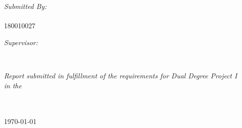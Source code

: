 \documentclass[
11pt, %
oneside, %
english, %
singlespacing, %
liststotoc, %
toctotoc, %
headsepline, %
]{MastersDoctoralThesis} %
\begin{document}
\begin{titlepage}
\begin{center}
\begin{minipage}[t]{0.4\textwidth}
\begin{flushleft} \large
\emph{Submitted By:}\\
{\authorname \\ 180010027} %
\end{flushleft}
\end{minipage}
\begin{minipage}[t]{0.4\textwidth}
\begin{flushright} \large
\emph{Supervisor:} \\
{\supname} %
\end{flushright}
\end{minipage}\\[1cm]
 
\vfill

\large \textit{Report submitted in fulfillment of the requirements for Dual Degree Project I}\\[0.3cm] %
\textit{in the}\\[0.05cm]
\groupname\\\deptname\\[2cm] %
 
\vfill

{\large \today}\\[2cm] %
 
\vfill
\end{center}
\end{titlepage}



\end{document}
